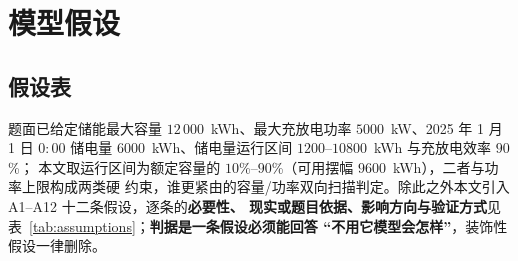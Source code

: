 
\section{模型假设}\label{chap:assump}

\subsection{假设表}

题面已给定储能最大容量 \(12\,000\)~kWh、最大充放电功率 \(5000\)~kW、2025 年 1 月 1 日
\(0{:}00\) 储电量 \(6000\)~kWh、储电量运行区间 \(1200\)--\(10800\)~kWh 与充放电效率 \(90\)\%；
本文取运行区间为额定容量的 \(10\)\%--\(90\)\%（可用摆幅 \(9600\)~kWh），二者与功率上限构成两类硬
约束，谁更紧由的容量/功率双向扫描判定。除此之外本文引入 A1--A12 十二条假设，逐条的\textbf{必要性、
现实或题目依据、影响方向与验证方式}见表~\ref{tab:assumptions}；\textbf{判据是一条假设必须能回答
“不用它模型会怎样”}，装饰性假设一律删除。

